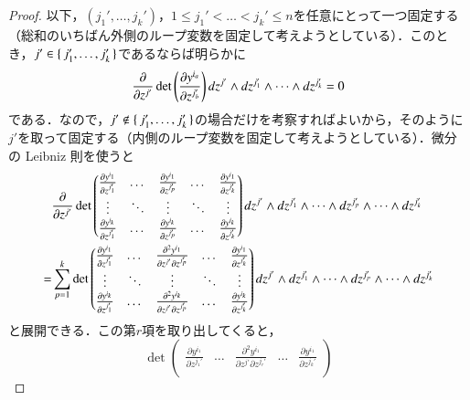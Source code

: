 \begin{proof}
以下，$(j_1', \dots, j_k')$，$1 \leq j_1' < \dots < j_k' \leq n$を任意にとって一つ固定する（総和のいちばん外側のループ変数を固定して考えようとしている）．このとき，$j' \in \set{j_1', \dots, j_k'}$であるならば明らかに
\begin{equation}
\frac{\partial}{\partial z^{j'}} \det \left( \frac{\partial y^{i_a}}{\partial z^{j_b'}} \right) \mathop{}\!d z^{j'} \wedge \mathop{}\!d z^{j_1'} \wedge \dots \wedge \mathop{}\!d z^{j_k'} = 0
\end{equation}である．なので，$j' \notin \set{j_1', \dots, j_k'}$の場合だけを考察すればよいから，そのように$j'$を取って固定する（内側のループ変数を固定して考えようとしている）．微分の Leibniz 則を使うと
\begin{align}
&\frac{\partial}{\partial z^{j'}} \det
    \begin{pmatrix}
    \frac{\partial y^{i_1}}{\partial z^{j_1'}} & \dots & \frac{\partial y^{i_1}}{\partial z^{j_p'}} & \dots & \frac{\partial y^{i_1}}{\partial z^{j_k'}} \\
    \vdots & \ddots & \vdots & \ddots & \vdots \\
    \frac{\partial y^{i_k}}{\partial z^{j_1'}} & \dots & \frac{\partial y^{i_k}}{\partial z^{j_p'}} & \dots & \frac{\partial y^{i_k}}{\partial z^{j_k'}} \\
    \end{pmatrix}
\dif z^{j'} \wedge \dif z^{j_1'} \wedge \dots \wedge \dif z^{j_p'} \wedge \dots \wedge \dif z^{j_k'} \\
= & \sum_{p=1}^k \det
    \begin{pmatrix}
    \frac{\partial y^{i_1}}{\partial z^{j_1'}} & \dots & \frac{\partial^2 y^{i_1}}{\partial z^{j'} \partial z^{j_p'}} & \dots & \frac{\partial y^{i_1}}{\partial z^{j_k'}} \\
    \vdots & \ddots & \vdots & \ddots & \vdots \\
    \frac{\partial y^{i_k}}{\partial z^{j_1'}} & \dots & \frac{\partial^2 y^{i_k}}{\partial z^{j'} \partial z^{j_p'}} & \dots & \frac{\partial y^{i_k}}{\partial z^{j_k'}} \\
    \end{pmatrix}
\dif z^{j'} \wedge \dif z^{j_1'} \wedge \dots \wedge \dif z^{j_p'} \wedge \dots \wedge \dif z^{j_k'}
\end{align}と展開できる．この第$r$項を取り出してくると，
\begin{equation}
\det
    \begin{pmatrix}
    \frac{\partial y^{i_1}}{\partial z^{j_1'}} & \dots & \frac{\partial^2 y^{i_1}}{\partial z^{j'} \partial z^{j_r'}} & \dots & \frac{\partial y^{i_1}}{\partial z^{j_k'}} \\

\end{pmatrix}
\end{equation}
\end{proof}
